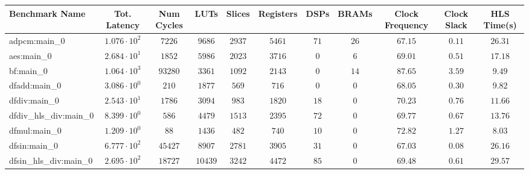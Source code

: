 \begin{tabular}{|l|c|c|c|c|c|c|c|c|c|c|}
\hline
Benchmark Name          & Tot. Latency           & Num Cycles & LUTs      & Slices    & Registers & DSPs    & BRAMs   & Clock Frequency & Clock Slack & HLS Time(s) \\
\hline
adpcm:main\_0           & $ 1.076 \cdot 10^{2} $ & $ 7226   $ & $ 9686  $ & $ 2937  $ & $ 5461  $ & $ 71  $ & $ 26  $ & $ 67.15       $ & $ 0.11    $ & $ 26.31   $ \\
aes:main\_0             & $ 2.684 \cdot 10^{1} $ & $ 1852   $ & $ 5986  $ & $ 2023  $ & $ 3716  $ & $ 0   $ & $ 6   $ & $ 69.01       $ & $ 0.51    $ & $ 17.18   $ \\
bf:main\_0              & $ 1.064 \cdot 10^{3} $ & $ 93280  $ & $ 3361  $ & $ 1092  $ & $ 2143  $ & $ 0   $ & $ 14  $ & $ 87.65       $ & $ 3.59    $ & $ 9.49    $ \\
dfadd:main\_0           & $ 3.086 \cdot 10^{0} $ & $ 210    $ & $ 1877  $ & $ 569   $ & $ 716   $ & $ 0   $ & $ 0   $ & $ 68.05       $ & $ 0.30    $ & $ 9.82    $ \\
dfdiv:main\_0           & $ 2.543 \cdot 10^{1} $ & $ 1786   $ & $ 3094  $ & $ 983   $ & $ 1820  $ & $ 18  $ & $ 0   $ & $ 70.23       $ & $ 0.76    $ & $ 11.66   $ \\
dfdiv\_hls\_div:main\_0 & $ 8.399 \cdot 10^{0} $ & $ 586    $ & $ 4479  $ & $ 1513  $ & $ 2395  $ & $ 72  $ & $ 0   $ & $ 69.77       $ & $ 0.67    $ & $ 13.76   $ \\
dfmul:main\_0           & $ 1.209 \cdot 10^{0} $ & $ 88     $ & $ 1436  $ & $ 482   $ & $ 740   $ & $ 10  $ & $ 0   $ & $ 72.82       $ & $ 1.27    $ & $ 8.03    $ \\
dfsin:main\_0           & $ 6.777 \cdot 10^{2} $ & $ 45427  $ & $ 8907  $ & $ 2781  $ & $ 3905  $ & $ 31  $ & $ 0   $ & $ 67.03       $ & $ 0.08    $ & $ 26.16   $ \\
dfsin\_hls\_div:main\_0 & $ 2.695 \cdot 10^{2} $ & $ 18727  $ & $ 10439 $ & $ 3242  $ & $ 4472  $ & $ 85  $ & $ 0   $ & $ 69.48       $ & $ 0.61    $ & $ 29.57   $ \\

\end{tabular}
